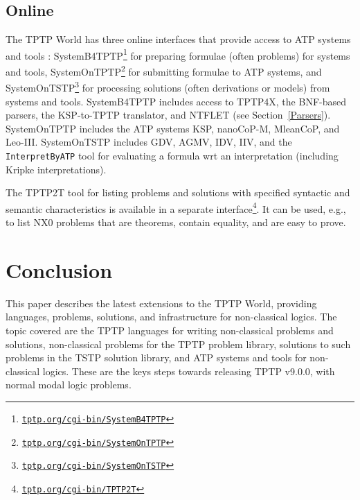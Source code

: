 \documentclass{ceurart}
\begin{document}
\subsection{Online}
\label{Online}

The TPTP World has three online interfaces that provide access to ATP systems and tools
\cite{Sut00-CADE-17,Sut07-CSR}:
SystemB4TPTP\footnote{%
\href{https://tptp.org/cgi-bin/SystemB4TPTP}{\tt tptp.org/cgi-bin/SystemB4TPTP}}
for preparing formulae (often problems) for systems and tools, 
SystemOnTPTP\footnote{%
\href{https://tptp.org/cgi-bin/SystemOnTPTP}{\tt tptp.org/cgi-bin/SystemOnTPTP}}
for submitting formulae to ATP systems, and 
SystemOnTSTP\footnote{%
\href{https://tptp.org/cgi-bin/SystemOnTSTP}{\tt tptp.org/cgi-bin/SystemOnTSTP}}
for processing solutions (often derivations or models) from systems and tools.
SystemB4TPTP includes access to TPTP4X, the BNF-based parsers, the KSP-to-TPTP translator, and 
NTFLET (see Section~\ref{Parsers}).
SystemOnTPTP includes the ATP systems KSP, nanoCoP-M, MleanCoP, and Leo-III.
SystemOnTSTP includes GDV, AGMV, IDV, IIV, and the {\tt InterpretByATP} tool for evaluating a 
formula wrt an interpretation (including Kripke interpretations).

The TPTP2T tool for listing problems and solutions with specified syntactic and semantic 
characteristics is available in a separate interface\footnote{%
\href{https://tptp.org/cgi-bin/TPTP2T}{\tt tptp.org/cgi-bin/TPTP2T}}. 
It can be used, e.g., to list NX0 problems that are theorems, contain equality, and are easy to 
prove.

\section{Conclusion}
\label{Conclusion}

This paper describes the latest extensions to the TPTP World, providing languages, problems,
solutions, and infrastructure for non-classical logics.
The topic covered are the TPTP languages for writing non-classical problems and solutions,
non-classical problems for the TPTP problem library,
solutions to such problems in the TSTP solution library,
and ATP systems and tools for non-classical logics.
These are the keys steps towards releasing TPTP v9.0.0, with normal modal logic problems.
\end{document}

